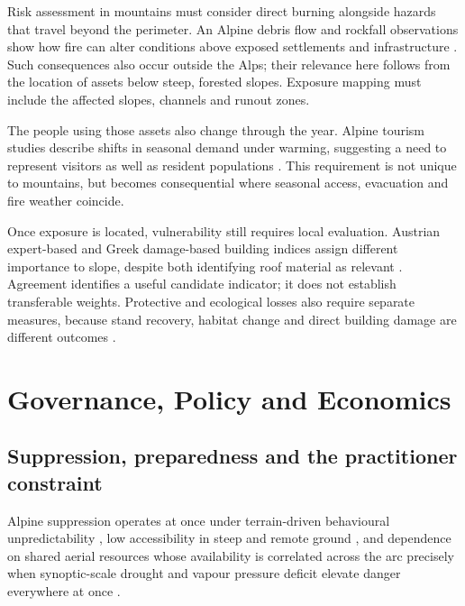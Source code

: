 \documentclass[11pt,a4paper]{article}
\begin{document}
Risk assessment in mountains must consider direct burning alongside hazards that travel beyond the perimeter. An Alpine debris flow and rockfall observations show how fire can alter conditions above exposed settlements and infrastructure \citep{laporta_postwildfire_2025, melzner_brief_2019}. Such consequences also occur outside the Alps; their relevance here follows from the location of assets below steep, forested slopes. Exposure mapping must include the affected slopes, channels and runout zones.

The people using those assets also change through the year. Alpine tourism studies describe shifts in seasonal demand under warming, suggesting a need to represent visitors as well as resident populations \citep{pede_mountain_2022}. This requirement is not unique to mountains, but becomes consequential where seasonal access, evacuation and fire weather coincide.

Once exposure is located, vulnerability still requires local evaluation. Austrian expert-based and Greek damage-based building indices assign different importance to slope, despite both identifying roof material as relevant \citep{papathomakohle_towards_2025, papathomakohle_wildfire_2022}. Agreement identifies a useful candidate indicator; it does not establish transferable weights. Protective and ecological losses also require separate measures, because stand recovery, habitat change and direct building damage are different outcomes \citep{gehring_shallow_2019, rey_effects_2019, arrogantefunes_mapping_2024}.

\section{Governance, Policy and Economics}
\label{sec:governance}

\subsection{Suppression, preparedness and the practitioner constraint}

Alpine suppression operates at once under terrain-driven behavioural unpredictability \citep{sharples_overview_2009, melzner_brief_2019}, low accessibility in steep and remote ground \citep{muller_forest_2020}, and dependence on shared aerial resources whose availability is correlated across the arc precisely when synoptic-scale drought and vapour pressure deficit elevate danger everywhere at once \citep{miller_compounding_2025}.
\end{document}
